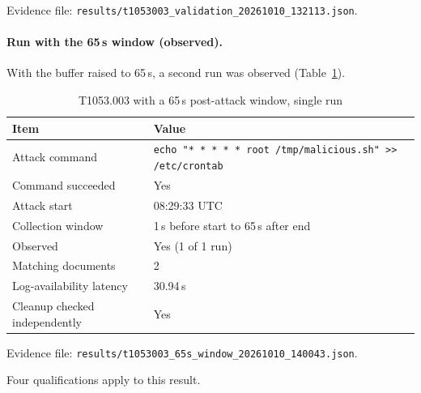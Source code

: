 \documentclass[11pt,a4paper]{article}
\begin{document}
Evidence file: \texttt{results/t1053003\_validation\_20261010\_132113.json}.

\paragraph{Run with the 65\,s window (observed).}
With the buffer raised to 65\,s, a second run was observed
(Table~\ref{tab:cron65}).

\begin{table}[H]
    \centering
    \caption{T1053.003 with a 65\,s post-attack window, single run}
    \label{tab:cron65}
    \begin{tabular}{lp{}}
        \toprule
        \textbf{Item} & \textbf{Value} \\
        \midrule
        Attack command & \texttt{echo "* * * * * root /tmp/malicious.sh" >{}> /etc/crontab} \\
        Command succeeded & Yes \\
        Attack start & 08:29:33 UTC \\
        Collection window & 1\,s before start to 65\,s after end \\
        Observed & Yes (1 of 1 run) \\
        Matching documents & 2 \\
        Log-availability latency & 30.94\,s \\
        Cleanup checked independently & Yes \\
        \bottomrule
    \end{tabular}
\end{table}

Evidence file: \texttt{results/t1053003\_65s\_window\_20261010\_140043.json}.

Four qualifications apply to this result.
\end{document}
